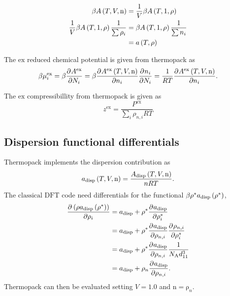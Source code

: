 \documentclass[12pt, letterpaper]{article}
\newcommand*{\pd}[3][]{\frac{\partial^{#1}#2}{\partial{#3}^{#1}}}%
\newcommand*{\lb}{\ensuremath{\left(}}
\newcommand*{\rb}{\ensuremath{\right)}}
\newcommand{\cdft}{\ensuremath{\text{classical DFT}}\xspace}
\newcommand{\excess}{\ensuremath{\text{ex}}\xspace}
\newcommand{\NA}{\ensuremath{N_{\text{A}}}\xspace}
\newcommand{\disp}{\ensuremath{\text{disp}}\xspace}
\begin{document}
\begin{align}
  \beta A \lb T, V, \mathrm{n} \rb &= \frac{1}{V}\beta A \lb T, 1, \mathrm{\rho} \rb \\
  \frac{1}{V}\beta A \lb T, 1, \mathrm{\rho} \rb\frac{1}{\sum \rho_i} &= \beta A \lb T, 1, \mathrm{\rho} \rb\frac{1}{\sum n_i}\nonumber \\
  &= a \lb T, \mathrm{\rho} \rb
\end{align}

The \excess reduced chemical potential is given from thermopack as
\begin{equation}
  \beta \mu_{i}^\excess = \beta\pd{A^\excess}{N_i} =
  \beta \pd{A^\excess \lb T, V, \mathrm{n} \rb}{n_i} \pd{n_i}{N_i} = \frac{1}{R T}\pd{A^\excess \lb T, V, \mathrm{n} \rb}{n_i}.
\end{equation}

The \excess compressibillity from thermopack is given as
\begin{equation}
  z^\excess = \frac{P^\excess}{\underset{i}{\sum} \rho_{n,i} R T}
\end{equation}

\subsection{Dispersion functional differentials}
Thermopack implements the dispersion contribution as
\begin{equation}
  a_\disp\lb T, V, \mathrm{n} \rb = \frac{A_\disp\lb T, V, \mathrm{n} \rb}{n R T}.
\end{equation}
The \cdft code need differentials for the functional $\beta \rho^* a_\disp\lb \rho^* \rb$,
\begin{align}
  \pd{\lb \rho a_\disp\lb \rho^* \rb \rb}{\rho_i} & = a_\disp +  \rho^* \pd{a_\disp}{\rho_i^*} \nonumber \\
                                                  & = a_\disp +  \rho^* \pd{a_\disp}{\rho_{n,i}} \pd{\rho_{n,i}}{\rho_i^*} \nonumber \\
                                                  & = a_\disp +  \rho^* \pd{a_\disp}{\rho_{n,i}} \frac{1}{\NA d_{11}^3}\nonumber \\
                                                  & = a_\disp +  \rho_n \pd{a_\disp}{\rho_{n,i}}.
\end{align}
Thermopack can then be evaluated setting $V=1.0$ and
$\mathrm{n}=\mathrm{\rho}_n$.
\clearpage


\end{document}
